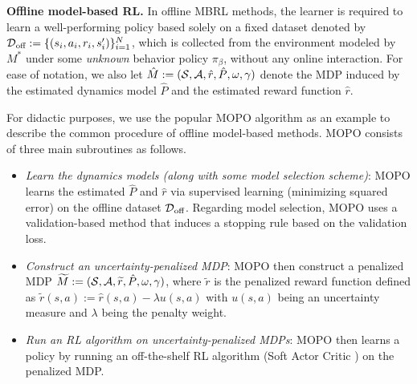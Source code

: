 \textbf{Offline model-based RL.} In {offline MBRL} methods, the learner is required to learn a well-performing policy based solely on a fixed dataset denoted by $\operatorname{\mathcal{D}}_{\text{off}}:=\{(s_i,a_i,r_i,s_i')\}_{i=1}^{N}$, which is collected from the environment modeled by $M^*$ under some \textit{unknown} behavior policy $\pi_\beta$, without any online interaction.
For ease of notation, we also let $\hat{M}:=(\operatorname{\mathcal{S}}, \operatorname{\mathcal{A}}, \hat{r}, \hat{P}, \omega, \gamma)$ denote the MDP induced by the estimated dynamics model $\hat{P}$ and the estimated reward function $\hat{r}$.

For didactic purposes, we use the popular MOPO algorithm \citep{yu2020mopo} as an example to describe the common procedure of offline model-based methods. MOPO consists of three main subroutines as follows.

\begin{itemize}[leftmargin=*]
    \item \textit{Learn the dynamics models (along with some model selection scheme)}: MOPO learns the estimated $\hat{P}$ and $\hat{r}$ via supervised learning (\eg minimizing squared error) on the offline dataset $\operatorname{\mathcal{D}}_{\text{off}}$. Regarding model selection, MOPO uses a validation-based method that induces a stopping rule based on the validation loss.
    \item \textit{Construct an uncertainty-penalized MDP}: MOPO then construct a penalized MDP $\widetilde{M}:=(\operatorname{\mathcal{S}}, \operatorname{\mathcal{A}}, \widetilde{r}, \hat{P}, \omega, \gamma)$, where $\widetilde{r}$ is the penalized reward function defined as $\widetilde{r}(s,a):=\hat{r}(s,a)-\lambda u(s,a)$ with $u(s,a)$ being an uncertainty measure and $\lambda$ being the penalty weight. 
    \item \textit{Run an RL algorithm on uncertainty-penalized MDPs}: MOPO then learns a policy by running an off-the-shelf RL algorithm (\eg Soft Actor Critic \citep{haarnoja2018soft}) on the penalized MDP.
\end{itemize}


